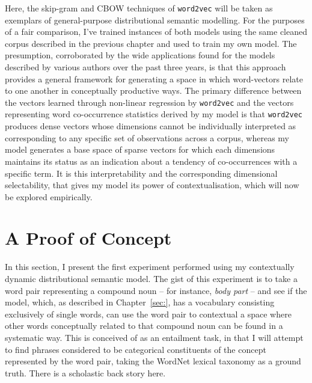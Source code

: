 Here, the skip-gram and CBOW techniques of \texttt{word2vec} will be taken as exemplars of general-purpose distributional semantic modelling.  For the purposes of a fair comparison, I've trained instances of both models using the same cleaned corpus described in the previous chapter and used to train my own model.  The presumption, corroborated by the wide applications found for the models described by various authors over the past three years, is that this approach provides a general framework for generating a space in which word-vectors relate to one another in conceptually productive ways.  The primary difference between the vectors learned through non-linear regression by \texttt{word2vec} and the vectors representing word co-occurrence statistics derived by my model is that \texttt{word2vec} produces dense vectors whose dimensions cannot be individually interpreted as corresponding to any specific set of observations across a corpus, whereas my model generates a base space of sparse vectors for which each dimensions maintains its status as an indication about a tendency of co-occurrences with a specific term.  It is this interpretability and the corresponding dimensional selectability, that gives my model its power of contextualisation, which will now be explored empirically.

\section{A Proof of Concept}
In this section, I present the first experiment performed using my contextually dynamic distributional semantic model.  The gist of this experiment is to take a word pair representing a compound noun -- for instance, \emph{body part} -- and see if the model, which, as described in Chapter~\ref{sec:}, has a vocabulary consisting exclusively of single words, can use the word pair to contextual a space where other words conceptually related to that compound noun can be found in a systematic way.  This is conceived of as an entailment task, in that I will attempt to find phrases considered to be categorical constituents of the concept represented by the word pair, taking the WordNet lexical taxonomy as a ground truth.  There is a scholastic back story here.

